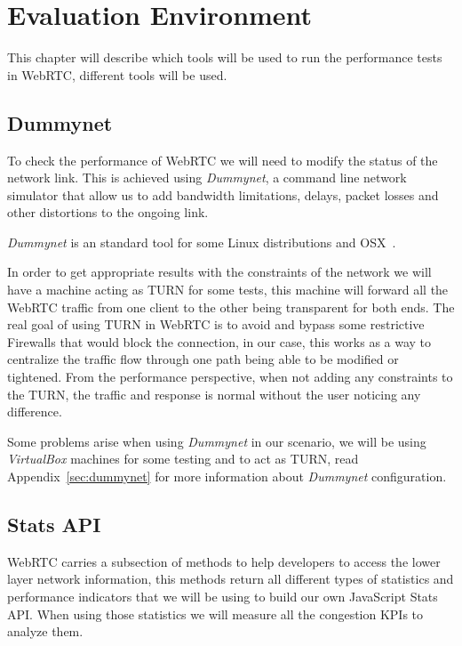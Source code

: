 \section{Evaluation Environment}
\label{sec:testingEnv}

\thispagestyle{empty}

This chapter will describe which tools will be used to run the performance tests in WebRTC, different tools will be used.

\subsection{Dummynet}

To check the performance of WebRTC we will need to modify the status of the network link. This is achieved using {\it Dummynet}, a command line network simulator that allow us to add bandwidth limitations, delays, packet losses and other distortions to the ongoing link.

{\it Dummynet} is an standard tool for some Linux distributions and OSX~\cite{dummynetTool}.

In order to get appropriate results with the constraints of the network we will have a machine acting as TURN for some tests, this machine will forward all the WebRTC traffic from one client to the other being transparent for both ends. The real goal of using TURN in WebRTC is to avoid and bypass some restrictive Firewalls that would block the connection, in our case, this works as a way to centralize the traffic flow through one path being able to be modified or tightened. From the performance perspective, when not adding any constraints to the TURN, the traffic and response is normal without the user noticing any difference.

Some problems arise when using {\it Dummynet} in our scenario, we will be using {\it VirtualBox} machines for some testing and to act as TURN, read Appendix~\ref{sec:dummynet} for more information about {\it Dummynet} configuration.

\subsection{Stats API}

WebRTC carries a subsection of methods to help developers to access the lower layer network information, this methods return all different types of statistics and performance indicators that we will be using to build our own JavaScript Stats API. When using those statistics we will measure all the congestion KPIs to analyze them.

